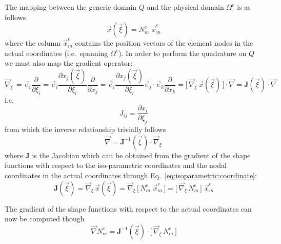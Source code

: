 \documentclass[times,namecite]{goose-article}
\begin{document}
The mapping between the generic domain $Q$ and the physical domain $\Omega^e$ is as follows
\begin{equation}
\label{eq:isoparametric:coordinate}
  \vec{x} ( \vec{\xi} ) = N_m^{e} \; \vec{x}_m^e
\end{equation}
where the column $\vec{x}_m^e$ contains the position vectors of the element nodes in the actual coordinates (i.e.\ spanning $\Omega^e$). In order to perform the quadrature on $Q$ we must also map the gradient operator:
\begin{equation}
  \vec{\nabla}_{\xi}\,
  =
  \vec{e}_i \frac{\partial}{\partial \xi_i}
  =
  \vec{e}_i \frac{\partial x_j(\vec{\xi})}{\partial \xi_i} \frac{\partial}{\partial x_j}
  =
  \vec{e}_i \frac{\partial x_j(\vec{\xi})}{\partial \xi_i} \vec{e}_j \cdot \vec{e}_k \frac{\partial}{\partial x_k}
  =
  \big[\, \vec{\nabla}_{\xi}\, \vec{x}(\vec{\xi}) \,\big] \cdot \vec{\nabla}
  =
  \bm{J}(\vec{\xi}) \cdot \vec{\nabla}
\end{equation}
i.e.
\begin{equation}
  J_{ij} = \frac{\partial x_i}{\partial \xi_j}
\end{equation}
from which the inverse relationship trivially follows
\begin{equation}
  \vec{\nabla} = \bm{J}^{-1}(\vec{\xi}) \cdot \vec{\nabla}_{\xi}\,
\end{equation}
where $\bm{J}$ is the Jacobian which can be obtained from the gradient of the shape functions with respect to the iso-parametric coordinates and the nodal coordinates in the actual coordinates through Eq.~\eqref{eq:isoparametric:coordinate}:
\begin{equation}
  \bm{J}(\vec{\xi})
  =
  \vec{\nabla}_{\xi}\, \vec{x}(\vec{\xi})
  =
  \vec{\nabla}_{\xi}\, \big[\, N_m^{e} \; \vec{x}_m^e \,\big]
  =
  \big[\, \vec{\nabla}_{\xi}\, N_m^{e} \,\big] \; \vec{x}_m^e
\end{equation}

The gradient of the shape functions with respect to the actual coordinates can now be computed though
\begin{equation}
  \vec{\nabla} N_m^{e}
  =
  \bm{J}^{-1}(\vec{\xi}) \cdot  \big[\, \vec{\nabla}_{\xi}\, N_m^{e} \,\big]
\end{equation}
\end{document}
